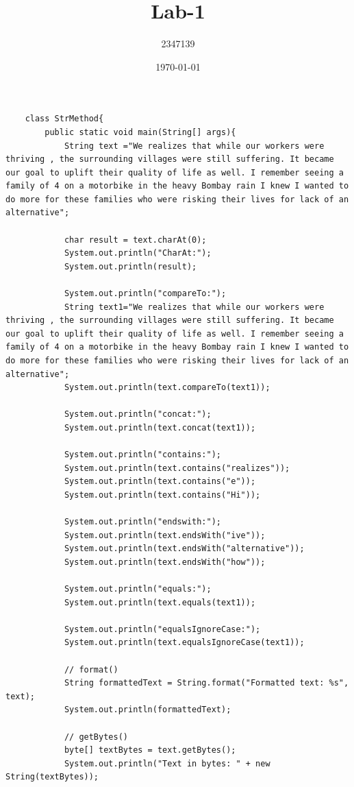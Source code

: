 \documentclass{article}
\title{Lab-1}
\author{2347139}
\date{\today}
\begin{document}
\maketitle
\begin{lstlisting}
    class StrMethod{
        public static void main(String[] args){
            String text ="We realizes that while our workers were thriving , the surrounding villages were still suffering. It became our goal to uplift their quality of life as well. I remember seeing a family of 4 on a motorbike in the heavy Bombay rain I knew I wanted to do more for these families who were risking their lives for lack of an alternative";

            char result = text.charAt(0);
            System.out.println("CharAt:");
            System.out.println(result);
    
            System.out.println("compareTo:");
            String text1="We realizes that while our workers were thriving , the surrounding villages were still suffering. It became our goal to uplift their quality of life as well. I remember seeing a family of 4 on a motorbike in the heavy Bombay rain I knew I wanted to do more for these families who were risking their lives for lack of an alternative";
            System.out.println(text.compareTo(text1));
    
            System.out.println("concat:");
            System.out.println(text.concat(text1));
    
            System.out.println("contains:");
            System.out.println(text.contains("realizes"));   
            System.out.println(text.contains("e"));   
            System.out.println(text.contains("Hi"));   
            
            System.out.println("endswith:");
            System.out.println(text.endsWith("ive"));   
            System.out.println(text.endsWith("alternative"));  
            System.out.println(text.endsWith("how"));  
            
            System.out.println("equals:");
            System.out.println(text.equals(text1));
            
            System.out.println("equalsIgnoreCase:");
            System.out.println(text.equalsIgnoreCase(text1));
            
            // format()
            String formattedText = String.format("Formatted text: %s", text);
            System.out.println(formattedText);
    
            // getBytes()
            byte[] textBytes = text.getBytes();
            System.out.println("Text in bytes: " + new String(textBytes));
    

\end{lstlisting}
\end{document}
